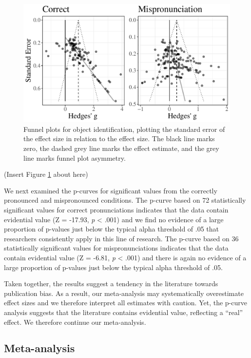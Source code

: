\documentclass[
  english,
  man, noextraspace]{apa6}
\begin{document}
\begin{figure}
\centering
\includegraphics{VonHolzenBergmann_MPMetaAnalysis_files/figure-latex/FunnelCombo-1.pdf}
\caption{\label{fig:FunnelCombo}Funnel plots for object identification, plotting the standard error of the effect size in relation to the effect size. The black line marks zero, the dashed grey line marks the effect estimate, and the grey line marks funnel plot asymmetry.}
\end{figure}

(Insert Figure \ref{fig:FunnelCombo} about here)

We next examined the p-curves for significant values from the correctly pronounced and mispronounced conditions. The p-curve based on 72 statistically significant values for correct pronunciations indicates that the data contain evidential value (Z = -17.93, \emph{p} \textless{} .001) and we find no evidence of a large proportion of p-values just below the typical alpha threshold of .05 that researchers consistently apply in this line of research. The p-curve based on 36 statistically significant values for mispronunciations indicates that the data contain evidential value (Z = -6.81, \emph{p} \textless{} .001) and there is again no evidence of a large proportion of p-values just below the typical alpha threshold of .05.

Taken together, the results suggest a tendency in the literature towards publication bias. As a result, our meta-analysis may systematically overestimate effect sizes and we therefore interpret all estimates with caution. Yet, the p-curve analysis suggests that the literature contains evidential value, reflecting a ``real'' effect. We therefore continue our meta-analysis.

\hypertarget{meta-analysis-1}{%
\subsection{Meta-analysis}\label{meta-analysis-1}}
\end{document}
